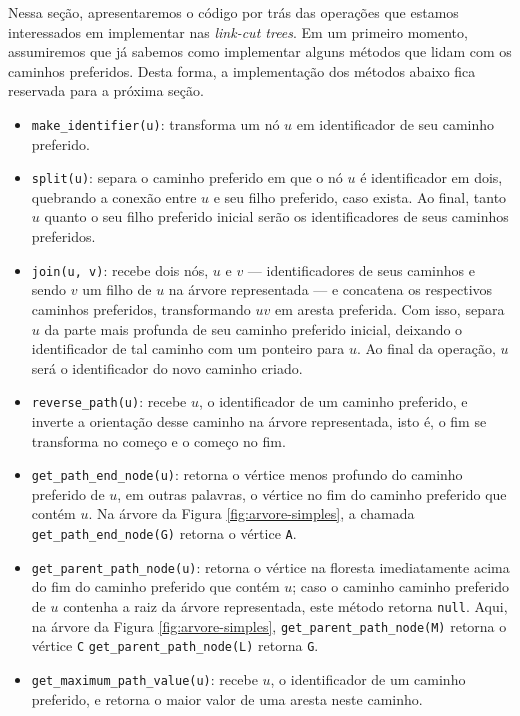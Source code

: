 Nessa seção, apresentaremos o código por trás das operações que estamos interessados em implementar nas \emph{link-cut trees}. Em um primeiro momento, assumiremos que já sabemos como implementar alguns métodos que lidam com os caminhos preferidos. Desta forma, a implementação dos métodos abaixo fica reservada para a próxima seção.

\begin{itemize}
    \item \texttt{make\_identifier(u)}: transforma um nó $u$ em identificador de seu caminho preferido.
    \item \texttt{split(u)}: separa o caminho preferido em que o nó $u$ é identificador em dois, quebrando a conexão entre $u$ e seu filho preferido, caso exista. Ao final, tanto $u$ quanto o seu filho preferido inicial serão os identificadores de seus caminhos preferidos.
    \item \texttt{join(u, v)}: recebe dois nós, $u$ e $v$ --- identificadores de seus caminhos e sendo $v$ um filho de $u$ na árvore representada --- e concatena os respectivos caminhos preferidos, transformando $uv$ em aresta preferida. Com isso, separa $u$ da parte mais profunda de seu caminho preferido inicial, deixando o identificador de tal caminho com um ponteiro para $u$. Ao final da operação, $u$ será o identificador do novo caminho criado.
    \item \texttt{reverse\_path(u)}: recebe $u$, o identificador de um caminho preferido, e inverte a orientação desse caminho na árvore representada, isto é, o fim se transforma no começo e o começo no fim.
    \item \texttt{get\_path\_end\_node(u)}: retorna o vértice menos profundo do caminho preferido de $u$, em outras palavras, o vértice no fim do caminho preferido que contém $u$. Na árvore da Figura \ref{fig:arvore-simples}, a chamada \texttt{get\_path\_end\_node(G)} retorna o vértice \texttt{A}.
    \item \texttt{get\_parent\_path\_node(u)}: retorna o vértice na floresta imediatamente acima do fim do caminho preferido que contém $u$; caso o caminho caminho preferido de $u$ contenha a raiz da árvore representada, este método retorna \texttt{null}. Aqui, na árvore da Figura \ref{fig:arvore-simples}, \texttt{get\_parent\_path\_node(M)} retorna o vértice \texttt{C} \texttt{get\_parent\_path\_node(L)} retorna \texttt{G}.
    \item \texttt{get\_maximum\_path\_value(u)}: recebe $u$, o identificador de um caminho preferido, e retorna o maior valor de uma aresta neste caminho.
\end{itemize}

